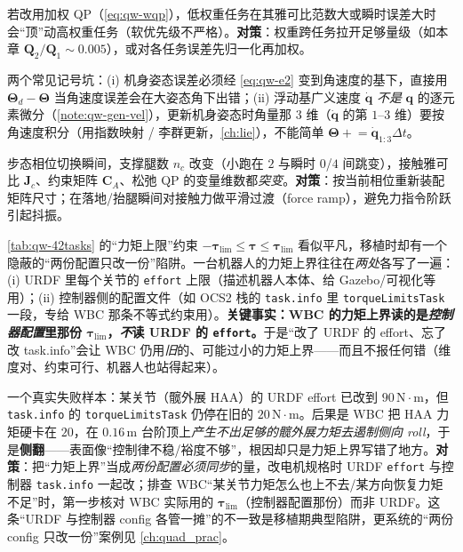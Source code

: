 \begin{pitfall}
若改用加权 QP（\cref{eq:qw-wqp}），低权重任务在其雅可比范数大或瞬时误差大时会“顶”动高权重任务（软优先级不严格）。\textbf{对策}：权重跨任务拉开足够量级（如本章 $\boldsymbol{Q}_2/\boldsymbol{Q}_1\sim0.005$），或对各任务误差先归一化再加权。
\end{pitfall}

\begin{pitfall}
两个常见记号坑：(i) 机身姿态误差必须经 \cref{eq:qw-e2} 变到角速度的基下，直接用 $\boldsymbol{\Theta}_d-\boldsymbol{\Theta}$ 当角速度误差会在大姿态角下出错；(ii) 浮动基广义速度 $\dot{\boldsymbol{q}}$ \emph{不是} $\boldsymbol{q}$ 的逐元素微分（\cref{note:qw-gen-vel}），更新机身姿态时角量那 $3$ 维（$\dot{\boldsymbol{q}}$ 的第 $1$--$3$ 维）要按角速度积分（用指数映射 / 李群更新，\cref{ch:lie}），不能简单 $\boldsymbol{\Theta}\!+\!=\!\dot{\boldsymbol{q}}_{1:3}\Delta t$。
\end{pitfall}

\begin{pitfall}
步态相位切换瞬间，支撑腿数 $n_c$ 改变（小跑在 $2$ 与瞬时 $0$/$4$ 间跳变），接触雅可比 $\boldsymbol{J}_c$、约束矩阵 $\boldsymbol{C}_A$、松弛 QP 的变量维数都\emph{突变}。\textbf{对策}：按当前相位重新装配矩阵尺寸；在落地/抬腿瞬间对接触力做平滑过渡（force ramp），避免力指令阶跃引起抖振。
\end{pitfall}

\begin{pitfall}\label{pit:qw-torque-task-vs-urdf}
\cref{tab:qw-42tasks} 的“力矩上限”约束 $-\boldsymbol{\tau}_{\lim}\le\boldsymbol{\tau}\le\boldsymbol{\tau}_{\lim}$ 看似平凡，移植时却有一个隐蔽的“两份配置只改一份”陷阱。一台机器人的力矩上界往往在\emph{两处}各写了一遍：(i) URDF 里每个关节的 \texttt{effort} 上限（描述机器人本体、给 Gazebo/可视化等用）；(ii) 控制器侧的配置文件（如 OCS2 栈的 \texttt{task.info} 里 \texttt{torqueLimitsTask} 一段，专给 WBC 那条不等式约束用）。\textbf{关键事实：WBC 的力矩上界读的是\emph{控制器配置}里那份 $\boldsymbol{\tau}_{\lim}$，\emph{不}读 URDF 的 \texttt{effort}。}于是“改了 URDF 的 effort、忘了改 task.info”会让 WBC 仍用\emph{旧}的、可能过小的力矩上界——而且不报任何错（维度对、约束可行、机器人也站得起来）。

一个真实失败样本：某关节（髋外展 HAA）的 URDF effort 已改到 $90\,\mathrm{N\cdot m}$，但 \texttt{task.info} 的 \texttt{torqueLimitsTask} 仍停在旧的 $20\,\mathrm{N\cdot m}$。后果是 WBC 把 HAA 力矩硬卡在 $20$，在 $0.16\,\mathrm{m}$ 台阶顶上\emph{产生不出足够的髋外展力矩去遏制侧向 roll}，于是\textbf{侧翻}——表面像“控制律不稳/裕度不够”，根因却只是力矩上界写错了地方。\textbf{对策}：把“力矩上界”当成\emph{两份配置必须同步}的量，改电机规格时 URDF \texttt{effort} 与控制器 \texttt{task.info} 一起改；排查 WBC“某关节力矩怎么也上不去/某方向恢复力矩不足”时，第一步核对 WBC 实际用的 $\boldsymbol{\tau}_{\lim}$（控制器配置那份）而非 URDF。这条“URDF 与控制器 config 各管一摊”的不一致是移植期典型陷阱，更系统的“两份 config 只改一份”案例见 \cref{ch:quad_prac}。
\end{pitfall}

